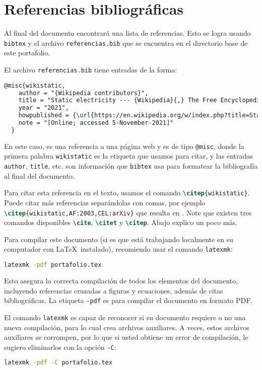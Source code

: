 \documentclass[../portafolio.tex]{subfiles}
\begin{document}
\section{Referencias bibliográficas}
Al final del documento encontrará una lista de referencias. Esto se logra usando \lstinline[language=TeX]!bibtex! y el archivo \lstinline[language=Bash]!referencias.bib! que se encuentra en el directorio base de este portafolio.

El archivo \lstinline[language=Bash]!referencias.bib! tiene entradas de la forma:
\begin{lstlisting}[language=TeX]
@misc{wikistatic,
    author = "{Wikipedia contributors}",
    title = "Static electricity --- {Wikipedia}{,} The Free Encyclopedia",
    year = "2021",
    howpublished = {\url{https://en.wikipedia.org/w/index.php?title=Static...}},
    note = "[Online; accessed 5-November-2021]"
  }
\end{lstlisting}

En este caso, es una referencia a una página web y es de tipo \lstinline[language=TeX]!@misc!, donde la primera palabra \lstinline[language=TeX]!wikistatic! es la etiqueta que usamos para citar, y las entradas \lstinline[language=TeX]!author!, \lstinline[language=TeX]!title!, etc. son información que \lstinline!bibtex! usa para formatear la bibliografía al final del documento.

Para citar esta referencia en el texto, usamos el comando \lstinline[language=TeX]!\citep{wikistatic}!. Puede citar más referencias separándolas con comas, por ejemplo \lstinline[language=TeX]!\citep{wikistatic,AF:2003,CEL:arXiv}! que resulta en \citep{wikistatic,AF:2003,CEL:arXiv}. Note que existen tres comandos disponibles \lstinline[language=TeX]!\cite!, \lstinline[language=TeX]!\citet! y \lstinline[language=TeX]!\citep!. Abajo explico un poco más.

Para compilar este documento (si es que está trabajando localmente en su computador con \LaTeX\ instalado), recomiendo usar el comando \lstinline[language=Bash]!latexmk!:
\begin{lstlisting}[language=Bash]
latexmk -pdf portafolio.tex
\end{lstlisting}

Esto asegura la correcta compilación de todos los elementos del
documento, incluyendo referencias cruzadas a figuras y ecuaciones,
además de citas bibliográficas. La etiqueta \lstinline[language=Bash]!-pdf! es para compilar el documento en formato PDF.

El comando \lstinline!latexmk! es capaz de reconocer si su documento requiere o no una nueva compilación, para lo cual crea archivos auxiliares. A veces, estos archivos auxiliares se corrompen, por lo que si usted obtiene un error de compilación, le sugiero eliminarlos con la opción \lstinline!-C!:
\begin{lstlisting}[language=Bash]
latexmk -pdf -C portafolio.tex
\end{lstlisting}
\end{document}
